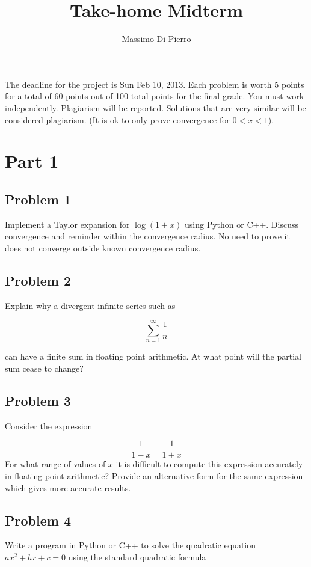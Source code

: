 \documentclass[12pt]{article}
\title{Take-home Midterm}
\author{Massimo Di Pierro}
\begin{document}
\maketitle

The deadline for the project is Sun Feb 10, 2013. Each problem is worth 5 points for a total of 60 points out of 100 total points for the final grade. You must work independently. Plagiarism will be reported. Solutions that are very similar will be considered plagiarism. (It is ok to only prove convergence for $0<x<1$).

\section{Part 1}

\subsection{Problem 1}

Implement a Taylor expansion for $\log(1+x)$ using Python or C++. Discuss convergence and reminder within the convergence radius. No need to prove it does not converge outside known convergence radius.

\subsection{Problem 2}

Explain why a divergent infinite series such as 

\[
\sum _{n=1}^{\infty} \frac1{n}
\]

can have a finite sum in floating point arithmetic. At what point will the partial sum cease to change?

\subsection{Problem 3}

Consider the expression

\[
\frac1{1-x} - \frac1{1+x}
\]
For what range of values of $x$ it is difficult to compute this expression accurately in floating point arithmetic? Provide an alternative form for the same expression which gives more accurate results.

\subsection{Problem 4}

Write a program in Python or C++ to solve the quadratic equation $a x^2 + b x +c =0$ using the standard quadratic formula
\end{document}
